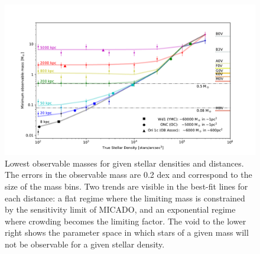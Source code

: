 \documentclass{aa}
\begin{document}
\begin{figure}

    \centering
    \includegraphics[width=\textwidth]{old_trusted_mass.pdf}

    \caption{Lowest observable masses for given stellar densities and distances.
    The errors in the observable mass are 0.2 dex and correspond to the size of the mass bins.
    Two trends are visible in the best-fit lines for each distance: a flat regime where the limiting mass is constrained by the sensitivity limit of MICADO, and an exponential regime where crowding becomes the limiting factor.
    The void to the lower right shows the parameter space in which stars of a given mass will not be observable for a given stellar density.
    }
    \label{fig:trusted_mass}
\end{figure}
\end{document}
